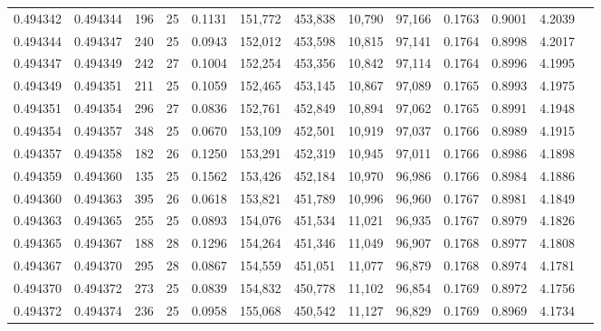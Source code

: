 \begin{tabular}{rrrrrrrrrrrrr}
0.494342 & 0.494344 & 196 &  25 &                                     0.1131 & 151,772 & 453,838 &  10,790 &  97,166 & 0.1763 & 0.9001 & 4.2039 \\
0.494344 & 0.494347 & 240 &  25 &                                     0.0943 & 152,012 & 453,598 &  10,815 &  97,141 & 0.1764 & 0.8998 & 4.2017 \\
0.494347 & 0.494349 & 242 &  27 &                                     0.1004 & 152,254 & 453,356 &  10,842 &  97,114 & 0.1764 & 0.8996 & 4.1995 \\
0.494349 & 0.494351 & 211 &  25 &                                     0.1059 & 152,465 & 453,145 &  10,867 &  97,089 & 0.1765 & 0.8993 & 4.1975 \\
0.494351 & 0.494354 & 296 &  27 &                                     0.0836 & 152,761 & 452,849 &  10,894 &  97,062 & 0.1765 & 0.8991 & 4.1948 \\
0.494354 & 0.494357 & 348 &  25 &                                     0.0670 & 153,109 & 452,501 &  10,919 &  97,037 & 0.1766 & 0.8989 & 4.1915 \\
0.494357 & 0.494358 & 182 &  26 &                                     0.1250 & 153,291 & 452,319 &  10,945 &  97,011 & 0.1766 & 0.8986 & 4.1898 \\
0.494359 & 0.494360 & 135 &  25 &                                     0.1562 & 153,426 & 452,184 &  10,970 &  96,986 & 0.1766 & 0.8984 & 4.1886 \\
0.494360 & 0.494363 & 395 &  26 &                                     0.0618 & 153,821 & 451,789 &  10,996 &  96,960 & 0.1767 & 0.8981 & 4.1849 \\
0.494363 & 0.494365 & 255 &  25 &                                     0.0893 & 154,076 & 451,534 &  11,021 &  96,935 & 0.1767 & 0.8979 & 4.1826 \\
0.494365 & 0.494367 & 188 &  28 &                                     0.1296 & 154,264 & 451,346 &  11,049 &  96,907 & 0.1768 & 0.8977 & 4.1808 \\
0.494367 & 0.494370 & 295 &  28 &                                     0.0867 & 154,559 & 451,051 &  11,077 &  96,879 & 0.1768 & 0.8974 & 4.1781 \\
0.494370 & 0.494372 & 273 &  25 &                                     0.0839 & 154,832 & 450,778 &  11,102 &  96,854 & 0.1769 & 0.8972 & 4.1756 \\
0.494372 & 0.494374 & 236 &  25 &                                     0.0958 & 155,068 & 450,542 &  11,127 &  96,829 & 0.1769 & 0.8969 & 4.1734 \\

\end{tabular}
